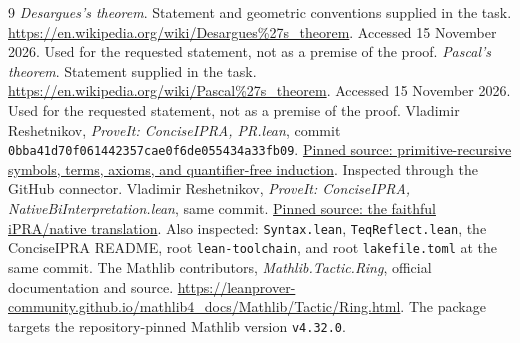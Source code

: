 \documentclass[11pt]{article}
\theoremstyle{definition}
\theoremstyle{remark}
\begin{document}
\begin{thebibliography}{9}
\emph{Desargues's theorem}. Statement and geometric conventions supplied
in the task. \url{https://en.wikipedia.org/wiki/Desargues%27s_theorem}.
Accessed 15 November 2026. Used for the requested statement, not as a
premise of the proof.
\emph{Pascal's theorem}. Statement supplied in the task.
\url{https://en.wikipedia.org/wiki/Pascal%27s_theorem}.
Accessed 15 November 2026. Used for the requested statement, not as a
premise of the proof.
Vladimir Reshetnikov, \emph{ProveIt: ConciseIPRA, PR.lean}, commit
\texttt{0bba41d70f061442357cae0f6de055434a33fb09}.
\href{https://github.com/VladimirReshetnikov/ProveIt/blob/0bba41d70f061442357cae0f6de055434a33fb09/Logic/PrimitiveRecursiveArithmetic/ConciseIPRA/Lean/ConciseIPRA/PR.lean}{Pinned source: primitive-recursive symbols, terms, axioms, and quantifier-free induction}.
Inspected through the GitHub connector.
Vladimir Reshetnikov, \emph{ProveIt: ConciseIPRA,
NativeBiInterpretation.lean}, same commit.
\href{https://github.com/VladimirReshetnikov/ProveIt/blob/0bba41d70f061442357cae0f6de055434a33fb09/Logic/PrimitiveRecursiveArithmetic/ConciseIPRA/Lean/ConciseIPRA/NativeBiInterpretation.lean}{Pinned source: the faithful iPRA/native translation}.
Also inspected: \texttt{Syntax.lean}, \texttt{TeqReflect.lean}, the
ConciseIPRA README, root \texttt{lean-toolchain}, and root
\texttt{lakefile.toml} at the same commit.
The Mathlib contributors, \emph{Mathlib.Tactic.Ring}, official
documentation and source.
\url{https://leanprover-community.github.io/mathlib4_docs/Mathlib/Tactic/Ring.html}.
The package targets the repository-pinned Mathlib version \texttt{v4.32.0}.
\end{thebibliography}
\end{document}
